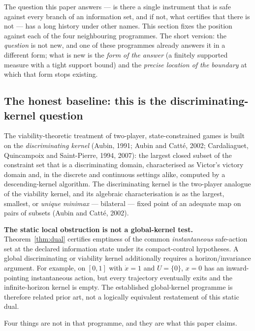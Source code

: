 \documentclass[10pt,twocolumn]{article}
\theoremstyle{definition}
\begin{document}
The question this paper answers --- is there a single instrument that is safe against every
branch of an information set, and if not, what certifies that there is not --- has a long
history under other names. This section fixes the position against each of the four
neighbouring programmes. The short version: the \emph{question} is not new, and one of these
programmes already answers it in a different form; what is new is the \emph{form of the
answer} (a finitely supported measure with a tight support bound) and the \emph{precise
location of the boundary} at which that form stops existing.

\subsection{The honest baseline: this is the discriminating-kernel question}

The viability-theoretic treatment of two-player, state-constrained games is built on the
\emph{discriminating kernel} (Aubin, 1991; Aubin and Catt\'e, 2002; Cardaliaguet, Quincampoix
and Saint-Pierre, 1994, 2007): the largest closed subset of the constraint set that is a
discriminating domain, characterised as Victor's victory domain and, in the discrete and
continuous settings alike, computed by a descending-kernel algorithm. The discriminating
kernel is the two-player analogue of the viability kernel, and its algebraic characterisation
is as the largest, smallest, or \emph{unique minimax} --- bilateral --- fixed point of an
adequate map on pairs of subsets (Aubin and Catt\'e, 2002).

\textbf{The static local obstruction is not a global-kernel test.}
Theorem~\ref{thm:dual} certifies emptiness of the common
\emph{instantaneous} safe-action set at the declared information
state under its compact-control hypotheses. A global discriminating
or viability kernel additionally requires a horizon/invariance
argument. For example, on $[0,1]$ with $\dot x=1$ and $U=\{0\}$,
$x=0$ has an inward-pointing instantaneous action, but every
trajectory eventually exits and the infinite-horizon kernel is
empty. The established global-kernel programme is therefore related
prior art, not a logically equivalent restatement of this static dual.

Four things are not in that programme, and they are what this paper claims.
\end{document}
